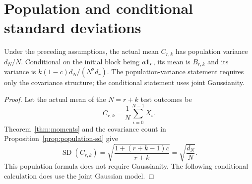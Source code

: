 \section{Population and conditional standard deviations}
\begin{theorem}
\label{thm:multiple-sd}
Under the preceding assumptions, the actual mean \(C_{r,k}\) has
population variance \(d_N/N\). Conditional on the initial block being
\(a\mathbf{1}_r\), its mean is \(B_{r,k}\) and its variance is
\(k(1-c)d_N/(N^2d_r)\). The population-variance statement requires only
the covariance structure; the conditional statement uses joint Gaussianity.
\end{theorem}
\begin{proof}
Let the actual mean of the \(N=r+k\) test outcomes be
\[
  C_{r,k}=\frac1N\sum_{i=0}^{N-1}X_i.
\]
Theorem~\ref{thm:moments} and the covariance count in
Proposition~\ref{prop:population-sd} give
\begin{equation}
  \boxed{\operatorname{SD}(C_{r,k})
    =\sqrt{\frac{1+(r+k-1)c}{r+k}}=\sqrt{\frac{d_N}{N}}.}
  \label{eq:multiple-population-sd}
\end{equation}
This population formula does not require Gaussianity. The following
conditional calculation does use the joint Gaussian model.


\end{proof}
